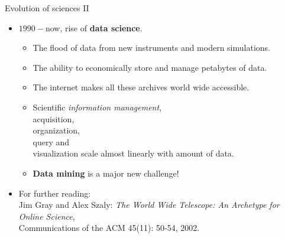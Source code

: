 \documentclass[aspectratio=169,t]{beamer}
\begin{document}
  { 
    \begin{frame}{Evolution of sciences II}
        \begin{itemize}
            \item $1990-$now, rise of \textbf{data science}.
                  \begin{itemize}
                      \item The flood of data from new instruments and modern simulations.
                      \item The ability to economically store and manage petabytes of data.
                      \item The internet makes all these archives world wide accessible.
                      \item Scientific \emph{information management}, \\
                            acquisition,\\
                            organization, \\
                            query and \\
                            visualization scale almost linearly with amount of data.
                      \item \textbf{Data mining} is a major new challenge!
                  \end{itemize}
          \item For further reading:\\
                \small{Jim Gray and Alex Szaly: \emph{The World Wide Telescope: An Archetype for Online Science}, \\ Communications of the ACM 45(11): 50-54, 2002.}
        \end{itemize}
    \end{frame}
  }
\end{document}
